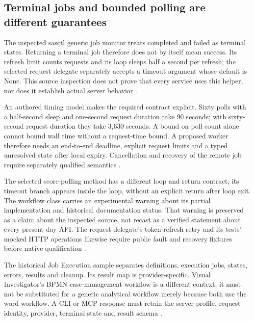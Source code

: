 \subsection{Terminal jobs and bounded polling are different guarantees}
The inspected sasctl generic job monitor treats completed and failed as
terminal states. Returning a terminal job therefore does not by itself
mean success. Its refresh limit counts requests and its loop sleeps half
a second per refresh; the selected request delegate separately accepts a
timeout argument whose default is None. This source inspection does not
prove that every service uses this helper, nor does it establish actual
server behavior \cite{exec23_workflow_delegates_sasctl}.

An authored timing model makes the required contract explicit. Sixty
polls with a half-second sleep and one-second request duration take
90 seconds; with sixty-second request duration they take 3,630 seconds.
A bound on poll count alone cannot bound wall time without a request-time
bound. A proposed worker therefore needs an end-to-end deadline, explicit
request limits and a typed unresolved state after local expiry. Cancellation
and recovery of the remote job require separately qualified semantics
\cite{exec24_sas_choice}.

The selected score-polling method has a different loop and return contract;
its timeout branch appears inside the loop, without an explicit return
after loop exit. The workflow class carries an experimental warning about
its partial implementation and historical documentation status. That
warning is preserved as a claim about the inspected source, not recast as
a verified statement about every present-day API. The request delegate's
token-refresh retry and its tests' mocked HTTP operations likewise require
public fault and recovery fixtures before native qualification
\cite{exec23_workflow_sasctl,exec23_workflow_delegates_sasctl}.

The historical Job Execution sample separates definitions, execution jobs,
states, errors, results and cleanup. Its result map is provider-specific.
Visual Investigator's BPMN case-management workflow is a different context;
it must not be substituted for a generic analytical workflow merely because
both use the word workflow. A CLI or MCP response must retain the server
profile, request identity, provider, terminal state and result schema
\cite{exec24_workflow_contracts_sas}.

